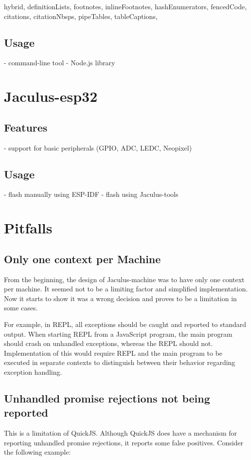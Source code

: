 \documentclass[
  digital,
  oneside,
  nosansbold,
  nocolorbold,
  lof,
  lot
]{fithesis4}
\begin{document}
\begin{markdown*}{%
  hybrid,
  definitionLists,
  footnotes,
  inlineFootnotes,
  hashEnumerators,
  fencedCode,
  citations,
  citationNbsps,
  pipeTables,
  tableCaptions,
}
\section{Usage}

  - command-line tool
  - Node.js library


\chapter{Jaculus-esp32}

\section{Features}

  - support for basic peripherals (GPIO, ADC, LEDC, Neopixel)

\section{Usage}

  - flash manually using ESP-IDF
  - flash using Jaculus-tools


\chapter{Pitfalls}

\section{Only one context per Machine}
From the beginning, the design of Jaculus-machine was to have only one context per machine. It seemed not to be a limiting factor and simplified implementation. Now it starts to show it was a wrong decision and proves to be a limitation in some cases.

For example, in REPL, all exceptions should be caught and reported to standard output. When starting REPL from a JavaScript program, the main program should crash on unhandled exceptions, whereas the REPL should not. Implementation of this would require REPL and the main program to be executed in separate contexts to distinguish between their behavior regarding exception handling.


\section{Unhandled promise rejections not being reported}
This is a limitation of QuickJS. Although QuickJS does have a mechanism for reporting unhandled promise rejections, it reports some false positives. Consider the following example:


\end{markdown*}
\end{document}
